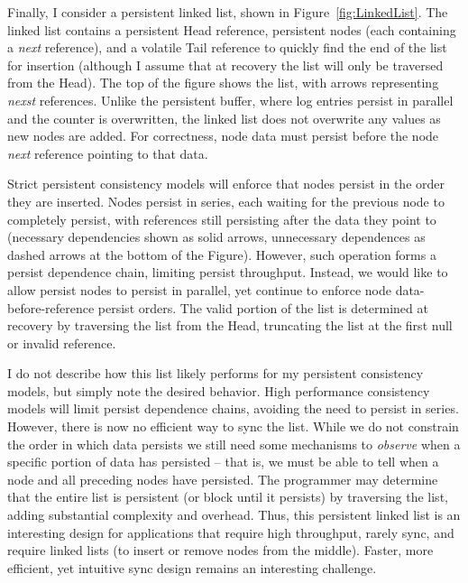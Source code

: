 

Finally, I consider a persistent linked list, shown in Figure~\ref{fig:LinkedList}.
The linked list contains a persistent Head reference, persistent nodes (each containing a \emph{next} reference), and a volatile Tail reference to quickly find the end of the list for insertion (although I assume that at recovery the list will only be traversed from the Head).
The top of the figure shows the list, with arrows representing \emph{nexst} references.
Unlike the persistent buffer, where log entries persist in parallel and the counter is overwritten, the linked list does not overwrite any values as new nodes are added.
For correctness, node data must persist before the node \emph{next} reference pointing to that data.

Strict persistent consistency models will enforce that nodes persist in the order they are inserted.
Nodes persist in series, each waiting for the previous node to completely persist, with references still persisting after the data they point to (necessary dependencies shown as solid arrows, unnecessary dependences as dashed arrows at the bottom of the Figure).
However, such operation forms a persist dependence chain, limiting persist throughput.
Instead, we would like to allow persist nodes to persist in parallel, yet continue to enforce node data-before-reference persist orders.
The valid portion of the list is determined at recovery by traversing the list from the Head, truncating the list at the first null or invalid reference.

I do not describe how this list likely performs for my persistent consistency models, but simply note the desired behavior.
High performance consistency models will limit persist dependence chains, avoiding the need to persist in series.
However, there is now no efficient way to sync the list.
While we do not constrain the order in which data persists we still need some mechanisms to \emph{observe} when a specific portion of data has persisted -- that is, we must be able to tell when a node and all preceding nodes have persisted.
The programmer may determine that the entire list is persistent (or block until it persists) by traversing the list, adding substantial complexity and overhead.
Thus, this persistent linked list is an interesting design for applications that require high throughput, rarely sync, and require linked lists (to insert or remove nodes from the middle).
Faster, more efficient, yet intuitive sync design remains an interesting challenge.

